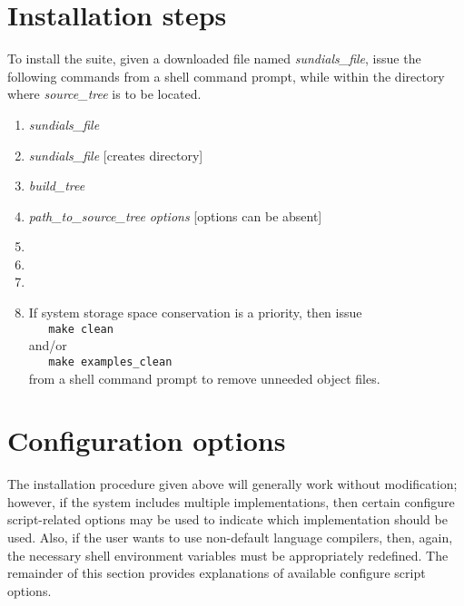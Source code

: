 \section{Installation steps}\label{ss:install_steps}

To install the {\sundials} suite, given a downloaded file named
{\em sundials\_file}, issue the following commands from
a shell command prompt, while within the directory where {\em source\_tree}
is to be located.  


\begin{enumerate}
\item {} {\em sundials\_file}
\item {} {\em sundials\_file}\hspace{2em} [creates  directory]
\item {} {\em build\_tree}
\item {\em path\_to\_source\_tree} {\em options}\hspace{2em} [options can be absent]
\item {}
\item {}
\item {}
\item If system storage space conservation is a priority, then issue \\
\verb+   make clean+ \\
and/or \\
\verb+   make examples_clean+ \\
from a shell command prompt to remove unneeded object files.
\end{enumerate}


\section{Configuration options}\label{ss:configuration_options}

The installation procedure given above will generally work without modification;
however, if the system includes multiple {\mpi} implementations, then certain
configure script-related options may be used to indicate which {\mpi}
implementation should be used. Also, if the user wants to use non-default
language compilers, then, again, the necessary shell environment variables must
be appropriately redefined.
The remainder of this section provides explanations of available configure script
options.


